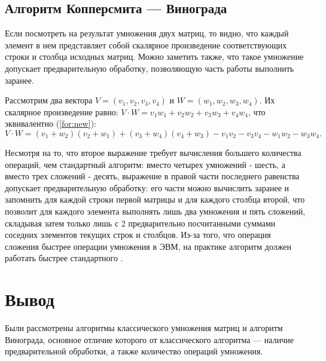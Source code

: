 \subsection{Алгоритм Копперсмита — Винограда}

Если посмотреть на результат умножения двух матриц, то видно, что каждый элемент в нем представляет собой скалярное произведение соответствующих строки и столбца исходных матриц.
Можно заметить также, что такое умножение допускает предварительную обработку, позволяющую часть работы выполнить заранее.

Рассмотрим два вектора $V = (v_1, v_2, v_3, v_4)$ и $W = (w_1, w_2, w_3, w_4)$.
Их скалярное произведение равно: $V \cdot W = v_1w_1 + v_2w_2 + v_3w_3 + v_4w_4$, что эквивалентно (\ref{for:new}):
\begin{equation}
    \label{for:new}
    V \cdot W = (v_1 + w_2)(v_2 + w_1) + (v_3 + w_4)(v_4 + w_3) - v_1v_2 - v_3v_4 - w_1w_2 - w_3w_4.
\end{equation}

Несмотря на то, что второе выражение требует вычисления большего количества операций, чем стандартный алгоритм: вместо четырех умножений - шесть, а вместо трех сложений - десять, выражение в правой части последнего равенства допускает предварительную обработку: его части можно вычислить заранее и запомнить для каждой строки первой матрицы и для каждого столбца второй, что позволит для каждого элемента выполнять лишь два умножения и пять сложений, складывая затем только лишь с 2 предварительно посчитанными суммами соседних элементов текущих строк и столбцов.
Из-за того, что операция сложения быстрее операции умножения в ЭВМ, на практике алгоритм должен работать быстрее стандартного \cite{Pogorelov}.

\section*{Вывод}
Были рассмотрены алгоритмы классического умножения матриц и алгоритм Винограда, основное отличие которого от классического алгоритма — наличие предварительной обработки, а также количество операций умножения.
